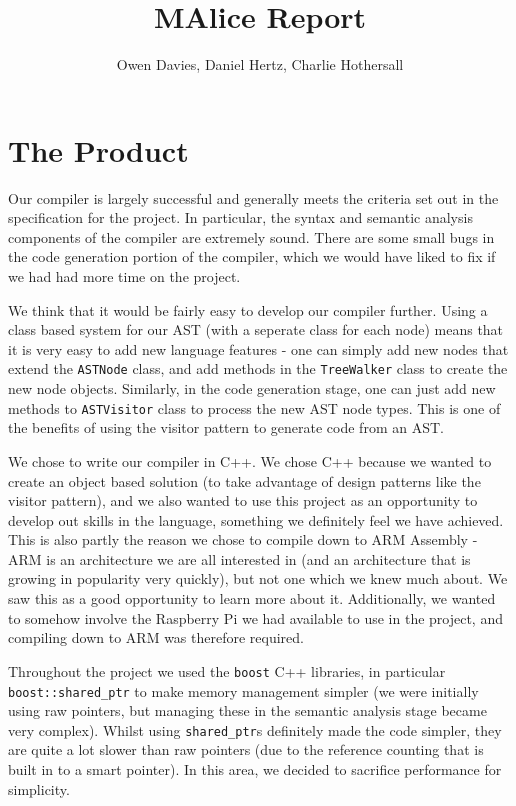 \documentclass[11pt, notitlepage]{report}
\begin{document}
\title{MAlice Report}
\author{Owen Davies, Daniel Hertz, Charlie Hothersall}
\date{}

\maketitle

\section*{The Product}
Our compiler is largely successful and generally meets the criteria set out in the specification for the project. In particular, the syntax and semantic analysis components of the compiler are extremely sound. There are some small bugs in the code generation portion of the compiler, which we would have liked to fix if we had had more time on the project.

We think that it would be fairly easy to develop our compiler further. Using a class based system for our AST (with a seperate class for each node) means that it is very easy to add new language features - one can simply add new nodes that extend the \texttt{ASTNode} class, and add methods in the \texttt{TreeWalker} class to create the new node objects. Similarly, in the code generation stage, one can just add new methods to \texttt{ASTVisitor} class to process the new AST node types. This is one of the benefits of using the visitor pattern to generate code from an AST.

We chose to write our compiler in C++. We chose C++ because we wanted to create an object based solution (to take advantage of design patterns like the visitor pattern), and we also wanted to use this project as an opportunity to develop out skills in the language, something we definitely feel we have achieved. This is also partly the reason we chose to compile down to ARM Assembly - ARM is an architecture we are all interested in (and an architecture that is growing in popularity very quickly), but not one which we knew much about. We saw this as a good opportunity to learn more about it. Additionally, we wanted to somehow involve the Raspberry Pi we had available to use in the project, and compiling down to ARM was therefore required.

Throughout the project we used the \texttt{boost} C++ libraries, in particular \texttt{boost::shared\_ptr} to make memory management simpler (we were initially using raw pointers, but managing these in the semantic analysis stage became very complex). Whilst using \texttt{shared\_ptr}s definitely made the code simpler, they are quite a lot slower than raw pointers (due to the reference counting that is built in to a smart pointer). In this area, we decided to sacrifice performance for simplicity.
\end{document}
